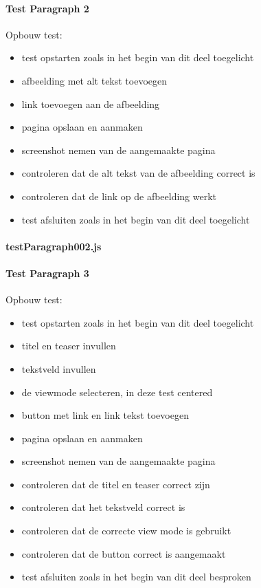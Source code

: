 \clearpage
\paragraph{Test Paragraph 2}
\label{test2}
Opbouw test: 
\begin{itemize}
\item test opstarten zoals in het begin van dit deel toegelicht
\item afbeelding met alt tekst toevoegen
\item link toevoegen aan de afbeelding
\item pagina opslaan en aanmaken
\item screenshot nemen van de aangemaakte pagina
\item controleren dat de alt tekst van de afbeelding correct is
\item controleren dat de link op de afbeelding werkt
\item test afsluiten zoals in het begin van dit deel toegelicht
\end{itemize}
\paragraph{testParagraph002.js}


\clearpage
\paragraph{Test Paragraph 3}
\label{test3}
Opbouw test: 
\begin{itemize}
\item test opstarten zoals in het begin van dit deel toegelicht
\item titel en teaser invullen
\item tekstveld invullen
\item de viewmode selecteren, in deze test centered
\item button met link en link tekst toevoegen
\item pagina opslaan en aanmaken
\item screenshot nemen van de aangemaakte pagina
\item controleren dat de titel en teaser correct zijn
\item controleren dat het tekstveld correct is
\item controleren dat de correcte view mode is gebruikt
\item controleren dat de button correct is aangemaakt
\item test afsluiten zoals in het begin van dit deel besproken
\end{itemize}
